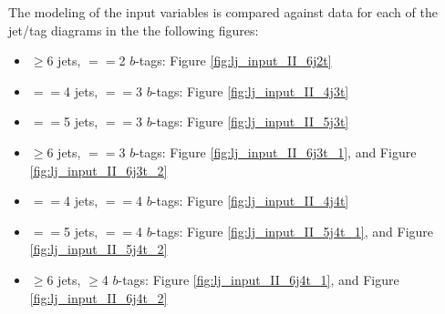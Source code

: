 \par The modeling of the input variables is compared against data for
each of the jet/tag diagrams in the the following figures: 

\begin{itemize}
  \item $\ge$6 jets,  $==$2 $b$-tags: Figure
    \ref{fig:lj_input_II_6j2t}
  \item $==$4 jets, $==$3 $b$-tags: Figure
    \ref{fig:lj_input_II_4j3t}
  \item $==$5 jets, $==$3 $b$-tags: Figure
    \ref{fig:lj_input_II_5j3t}
  \item $\ge$6 jets, $==$3 $b$-tags: Figure
    \ref{fig:lj_input_II_6j3t_1}, and Figure \ref{fig:lj_input_II_6j3t_2}
  \item $==$4 jets, $==$4 $b$-tags: Figure
    \ref{fig:lj_input_II_4j4t}
  \item $==$5 jets, $==$4 $b$-tags: Figure
    \ref{fig:lj_input_II_5j4t_1}, and Figure \ref{fig:lj_input_II_5j4t_2}
  \item $\ge$6 jets, $\ge$4 $b$-tags: Figure
    \ref{fig:lj_input_II_6j4t_1}, and Figure \ref{fig:lj_input_II_6j4t_2}
\end{itemize}


